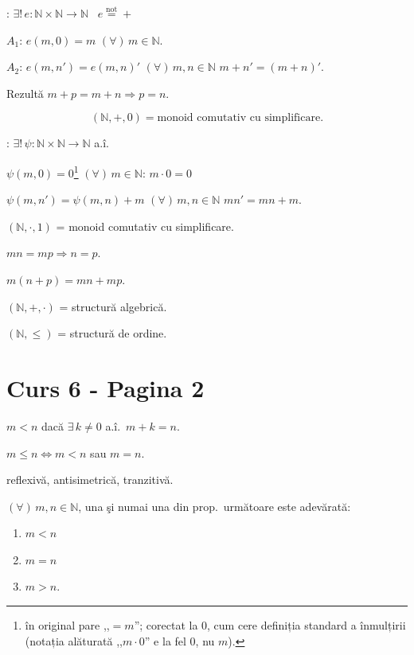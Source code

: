 \bigskip
\noindent{}: $\exists!\, e:\mathbb{N}\times\mathbb{N}\to\mathbb{N}$ \ $e\overset{\text{not}}{=}+$

\noindent $A_1$: $e(m,0)=m$ $(\forall)\,m\in\mathbb{N}$.

\noindent $A_2$: $e(m,n')=e(m,n)'$ $(\forall)\,m,n\in\mathbb{N}$ \quad $m+n'=(m+n)'$.

\bigskip
\noindent Rezultă $m+p=m+n \Rightarrow p=n$.

\[
(\mathbb{N},+,0) = \text{monoid comutativ cu simplificare.}
\]

\bigskip
\noindent{}: $\exists!\, \psi:\mathbb{N}\times\mathbb{N}\to\mathbb{N}$ a.î.

\noindent $\psi(m,0)=0$\footnote{în original pare ,,$=m$''; corectat la $0$, cum cere definiția standard a înmulțirii (notația alăturată ,,$m\cdot 0$'' e la fel $0$, nu $m$).} $(\forall)\,m\in\mathbb{N}$: \quad $m\cdot 0=0$

\noindent $\psi(m,n')=\psi(m,n)+m$ $(\forall)\,m,n\in\mathbb{N}$ \quad $mn'=mn+m$.

\bigskip
\noindent $(\mathbb{N},\cdot,1)$ = monoid comutativ cu simplificare.

\noindent $mn=mp \Rightarrow n=p$.

\noindent $m(n+p)=mn+mp$.

\bigskip
\noindent $(\mathbb{N},+,\cdot)$ = structură algebrică.

\noindent $(\mathbb{N},\leq)$ = structură de ordine.



\section*{Curs 6 - Pagina 2}

\noindent $m<n$ dacă $\exists\, k\neq 0$ a.î.\ $m+k=n$.

\noindent $m\leq n \Longleftrightarrow m<n$ sau $m=n$.

\noindent reflexivă, antisimetrică, tranzitivă.

\bigskip
\noindent $(\forall)\,m,n\in\mathbb{N}$, una şi numai una din prop.\ următoare este adevărată:

\begin{enumerate}
\item[(1)] $m<n$
\item[(2)] $m=n$
\item[(3)] $m>n$.
\end{enumerate}

